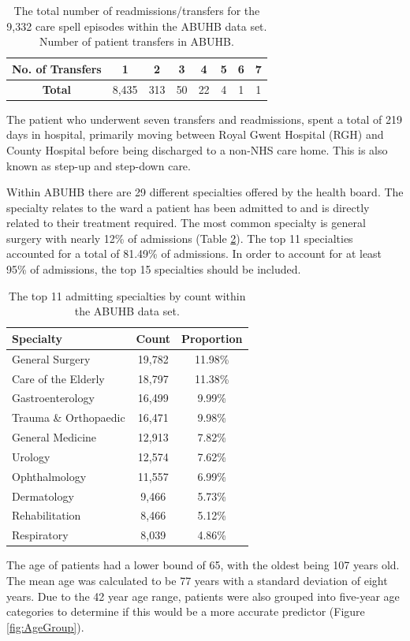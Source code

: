 \documentclass[../thesis.tex]{subfiles}
\begin{document}
\begin{table}[h!]
    \centering
    \begin{tabular}{cccccccc}\toprule
    \textbf{No. of Transfers} &\textbf{1} & \textbf{2} & \textbf{3} & \textbf{4} & \textbf{5} & \textbf{6} & \textbf{7}   \\ \midrule
\textbf{Total} & 8,435 & 313 & 50 & 22 & 4 & 1& 1\\ \bottomrule
    \end{tabular}
    \caption{The total number of readmissions/transfers for the 9,332 care spell episodes within the ABUHB data set. Number of patient transfers in ABUHB.}
    \label{Tab:Spell}
\end{table}

The patient who underwent seven transfers and readmissions, spent a total of 219 days in hospital, primarily moving between Royal Gwent Hospital (RGH) and County Hospital before being discharged to a non-NHS care home. This is also known as step-up and step-down care.

Within ABUHB there are 29 different specialties offered by the health board. The specialty relates to the ward a patient has been admitted to and is directly related to their treatment required. The most common specialty is general surgery with nearly 12\% of admissions (Table \ref{tab:admittingspec}). The top 11 specialties accounted for a total of 81.49\% of admissions. In order to account for at least 95\% of admissions, the top 15 specialties should be included.

\begin{table}[h!]
    \centering
    \begin{tabular}{lcc}\toprule
        Specialty  & Count & Proportion  \\\midrule
        General Surgery  & 19,782 & 11.98\% \\
        Care of the Elderly & 18,797 & 11.38\% \\
        Gastroenterology	&16,499	&9.99\% \\
        Trauma \& Orthopaedic&	16,471	&9.98\% \\
        General Medicine &	12,913&	7.82\% \\
        Urology &	12,574	&7.62\% \\
        Ophthalmology & 	11,557 &	6.99\%\\
        Dermatology & 	9,466 &	5.73\%\\
        Rehabilitation & 	8,466 &	5.12\%\\
        Respiratory & 	8,039 &	4.86\%\\\bottomrule
    \end{tabular}
    \caption{The top 11 admitting specialties by count within the ABUHB data set.}
    \label{tab:admittingspec}
\end{table}
The age of patients had a lower bound of 65, with the oldest being 107 years old. The mean age was calculated to be 77 years with a standard deviation of eight years. Due to the 42 year age range, patients were also grouped into five-year age categories to determine if this would be a more accurate predictor (Figure \ref{fig:AgeGroup}). 
\end{document}

